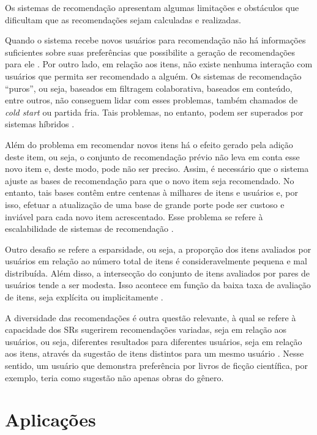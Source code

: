     Os sistemas de recomendação apresentam algumas limitações e obstáculos que dificultam que as recomendações sejam calculadas e realizadas. 
    
    Quando o sistema recebe novos usuários para recomendação não há informações suficientes sobre suas preferências que possibilite a geração de recomendações para ele \cite{Bobadilla_2013}. Por outro lado, em relação aos itens, não existe nenhuma interação com usuários que permita ser recomendado a alguém. Os sistemas de recomendação ``puros'', ou seja, baseados em filtragem colaborativa, baseados em conteúdo, entre outros, não conseguem lidar com esses problemas, também chamados de \textit{cold start} ou partida fria. Tais problemas, no entanto, podem ser superados por sistemas híbridos \cite{Miranda2010}.
    
    Além do problema em recomendar novos itens há o efeito gerado pela adição deste item, ou seja, o conjunto de recomendação prévio não leva em conta esse novo item e, deste modo, pode não ser preciso. Assim, é necessário que o sistema ajuste as bases de recomendação para que o novo item seja recomendado. No entanto, tais bases contêm entre centenas à milhares de itens e usuários e, por isso, efetuar a atualização de uma base de grande porte pode ser custoso e inviável para cada novo item acrescentado. Esse problema se refere à escalabilidade de sistemas de recomendação \cite{Lue2012}. 
    
    Outro desafio se refere a esparsidade, ou seja, a proporção dos itens avaliados por usuários em relação ao número total de itens é consideravelmente pequena e mal distribuída. Além disso, a intersecção do conjunto de itens avaliados por pares de usuários tende a ser modesta. Isso acontece em função da baixa taxa de avaliação de itens, seja explícita ou implicitamente \cite{Lue2012, Sharma2017}.

    A diversidade das recomendações é outra questão relevante, à qual se refere à capacidade dos SRs sugerirem recomendações variadas, seja em relação aos usuários, ou seja, diferentes resultados para diferentes usuários, seja em relação aos itens, através da sugestão de itens distintos para um mesmo usuário \cite{Lue2012}. Nesse sentido, um usuário que demonstra preferência por livros de ficção científica, por exemplo, teria como sugestão não apenas obras do gênero.

\section{Aplicações}

